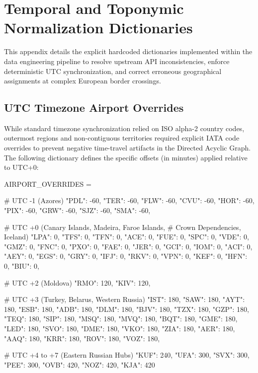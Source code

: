 \chapter{Temporal and Toponymic Normalization Dictionaries}
\label{sec:appendix-c-normalization-dictionaries}

This appendix details the explicit hardcoded dictionaries implemented within the data engineering pipeline to resolve upstream API inconsistencies, enforce deterministic UTC synchronization, and correct erroneous geographical assignments at complex European border crossings.

\section{UTC Timezone Airport Overrides}
\label{subsec:appendix-c-utc-overrides}

While standard timezone synchronization relied on ISO alpha-2 country codes, outermost regions and non-contiguous territories required explicit IATA code overrides to prevent negative time-travel artifacts in the Directed Acyclic Graph. The following dictionary defines the specific offsets (in minutes) applied relative to UTC+0:

\begin{appendixcode}
AIRPORT_OVERRIDES = {
    # UTC -1 (Azores)
    "PDL": -60, "TER": -60, "FLW": -60, "CVU": -60, "HOR": -60,
    "PIX": -60, "GRW": -60, "SJZ": -60, "SMA": -60,

    # UTC +0 (Canary Islands, Madeira, Faroe Islands,
    # Crown Dependencies, Iceland)
    "LPA": 0, "TFS": 0, "TFN": 0, "ACE": 0, "FUE": 0, "SPC": 0,
    "VDE": 0, "GMZ": 0, "FNC": 0, "PXO": 0, "FAE": 0, "JER": 0,
    "GCI": 0, "IOM": 0, "ACI": 0, "AEY": 0, "EGS": 0, "GRY": 0,
    "IFJ": 0, "RKV": 0, "VPN": 0, "KEF": 0, "HFN": 0, "BIU": 0,

    # UTC +2 (Moldova)
    "RMO": 120, "KIV": 120,

    # UTC +3 (Turkey, Belarus, Western Russia)
    "IST": 180, "SAW": 180, "AYT": 180, "ESB": 180, "ADB": 180,
    "DLM": 180, "BJV": 180, "TZX": 180, "GZP": 180, "TEQ": 180,
    "SIP": 180, "MSQ": 180, "MVQ": 180, "BQT": 180, "GME": 180,
    "LED": 180, "SVO": 180, "DME": 180, "VKO": 180, "ZIA": 180,
    "AER": 180, "AAQ": 180, "KRR": 180, "ROV": 180, "VOZ": 180,

    # UTC +4 to +7 (Eastern Russian Hubs)
    "KUF": 240, "UFA": 300, "SVX": 300, "PEE": 300, "OVB": 420,
    "NOZ": 420, "KJA": 420
}
\end{appendixcode}

